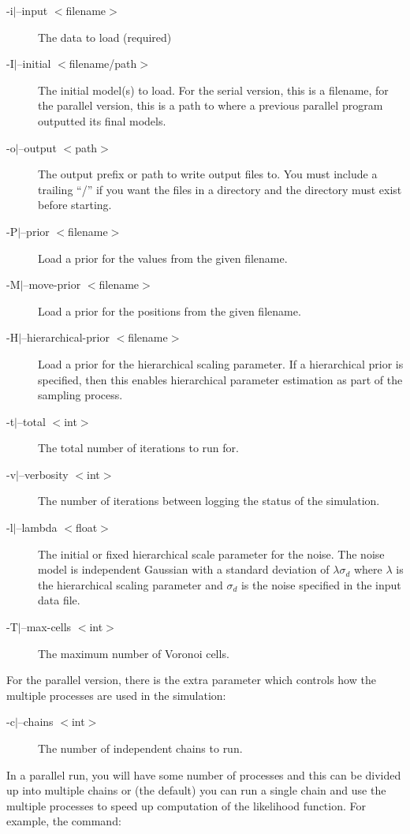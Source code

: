 \documentclass[a4paper,12pt]{article}
\begin{document}
\begin{description}
\item [-i$|$--input $<$filename$>$] The data to load (required)
\item [-I$|$--initial $<$filename/path$>$] The initial model(s) to load. For the serial version,
  this is a filename, for the parallel version, this is a path to where a previous parallel
  program outputted its final models.
\item [-o$|$--output $<$path$>$] The output prefix or path to write output files to. You must include
  a trailing ``/'' if you want the files in a directory and the directory must exist before starting.
\item [-P$|$--prior $<$filename$>$] Load a prior for the values from the given filename.
\item [-M$|$--move-prior $<$filename$>$] Load a prior for the positions from the given filename.
\item [-H$|$--hierarchical-prior $<$filename$>$] Load a prior for the hierarchical scaling parameter. If a
  hierarchical prior is specified, then this enables hierarchical parameter estimation as part of the
  sampling process.
\item [-t$|$--total $<$int$>$] The total number of iterations to run for.
\item [-v$|$--verbosity $<$int$>$] The number of iterations between logging the status of the simulation.
\item [-l$|$--lambda $<$float$>$] The initial or fixed hierarchical scale parameter for the noise. The noise
  model is independent Gaussian with a standard deviation of $\lambda \sigma_d$ where $\lambda$ is
  the hierarchical scaling parameter and $\sigma_d$ is the noise specified in the input data file.
\item [-T$|$--max-cells $<$int$>$] The maximum number of Voronoi cells.
\end{description}

For the parallel version, there is the extra parameter which controls how the multiple
processes are used in the simulation:

\begin{description}
\item [-c$|$--chains $<$int$>$] The number of independent chains to run.
\end{description}

In a parallel run, you will have some number of processes and this can be divided up
into multiple chains or (the default) you can run a single chain and use the
multiple processes to speed up computation of the likelihood function. For example,
the command:
\end{document}
